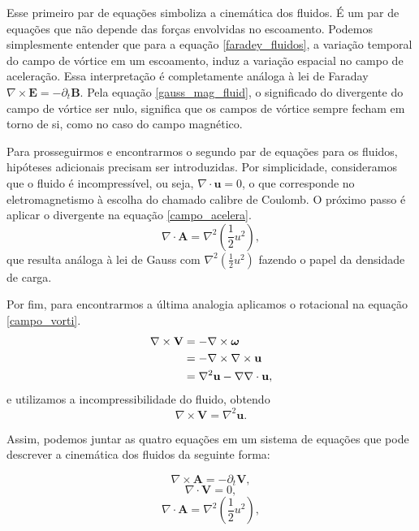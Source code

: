 Esse primeiro par de equações simboliza a cinemática dos fluidos. É um par de equações que não depende das forças envolvidas no escoamento. Podemos simplesmente entender que para a equação \ref{faradey_fluidos}, a variação temporal do campo de vórtice em um escoamento, induz a variação espacial no campo de aceleração. Essa interpretação é completamente análoga à lei de Faraday $\nabla \times \textbf{E} = -\partial_{t} \textbf{B}$. Pela equação \ref{gauss_mag_fluid}, o significado do divergente do campo de vórtice ser nulo, significa que os campos de vórtice sempre fecham em torno de si, como no caso do campo magnético.

Para prosseguirmos e encontrarmos o segundo par de equações para os fluidos, hipóteses adicionais precisam ser introduzidas. Por simplicidade, consideramos que o fluido é incompressível, ou seja, $\nabla \cdot \textbf{u} = 0$, o que corresponde no eletromagnetismo à escolha do chamado calibre de Coulomb. O próximo passo é aplicar o divergente na equação \ref{campo_acelera}.
\begin{equation}\label{gauss_fluido}
    \nabla \cdot \textbf{A} = \nabla^{2} \left(\frac{1}{2}u^{2}\right),
\end{equation}
que resulta análoga à lei de Gauss com $ \nabla^{2} \left(\frac{1}{2}u^{2}\right)$ fazendo o papel da densidade de carga.

Por fim, para encontrarmos a última analogia aplicamos o rotacional na equação \ref{campo_vorti}.
\begin{align*}
    \nabla\times\textbf{V} &=   -\nabla\times\text{\boldmath$\omega$}\\
    & = -\nabla\times\nabla\times\textbf{u}\\
    & = \nabla^{2}\textbf{u} - \nabla \nabla\cdot\textbf{u},\\
\end{align*}
e utilizamos a incompressibilidade do fluido, obtendo 
\begin{equation}\label{amper-max_fluido}
\nabla\times\textbf{V} = \nabla^{2}\textbf{u}.
\end{equation}

Assim, podemos juntar as quatro equações em um sistema de equações que pode descrever a cinemática dos fluidos da seguinte forma:

\begin{equation}\label{faradey_fluidos2}
    \nabla \times \textbf{A} = -\partial_{t} \textbf{V},
\end{equation}
\begin{equation}\label{gauss_mag_fluid2}
    \nabla \cdot \textbf{V}=0,
\end{equation}
\begin{equation}\label{gauss_fluido2}
    \nabla \cdot \textbf{A} = \nabla^{2} \left(\frac{1}{2}u^{2}\right),
\end{equation}

